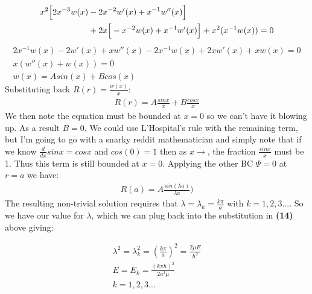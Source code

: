 \documentclass{article}
\begin{document}
\begin{equation}
\begin{aligned}
x^2 \Big{[} 2x^{-3}w(x) &- 2x^{-2}w'(x) + x^{-1}w''(x) \Big{]}\\
 &+ 2x \Big{[}-x^{-2}w(x) + x^{-1}{w'(x)} \Big{]} + x^2(x^{-1}w(x)) = 0\\
\end{aligned}
\end{equation}
\begin{equation}
\begin{aligned}
 2x^{-1}w(x) - 2w'(x) + xw''(x) - 2x^{-1}w(x) + 2xw'(x) + xw(x) = 0\\
 x(w''(x) + w(x)) = 0\\
 w(x) = Asin(x) + Bcos(x)
\end{aligned}
\end{equation}
Substituting back $R(r) = \frac{w(x)}{x}$:
\begin{equation}
\begin{aligned}
R(r) = A\frac{sinx}{x} + B\frac{cosx}{x}
\end{aligned}
\end{equation}
We then note the equation must be bounded at $x=0$ so we can't have it blowing up. As a result $B=0$. We could use L'Hospital's rule with the remaining term, but I'm going to go with a snarky reddit mathematician and simply note that if we know $\frac{d}{dx}sinx = cosx$ and $cos(0) = 1$ then as $x\to$, the fraction $\frac{sinx}{x}$ must be 1. Thus this term is still bounded at $x=0$. Applying the other BC $\Psi=0$ at $r=a$ we have:
\begin{equation}
\begin{aligned}
R(a) = A\frac{sin(\lambda a)}{\lambda a})
\end{aligned}
\end{equation}
The resulting non-trivial solution requires that $\lambda = \lambda_k=\frac{k\pi}{a}$ with $k=1,2,3...$. So we have our value for $\lambda$, which we can plug back into the substitution in \textbf{(14)} above giving:
\begin{tcolorbox}[minipage,colback=white,arc=0pt,outer arc=0pt]
\begin{equation}
\begin{aligned}
\lambda^2 = \lambda_k^2 = (\frac{k\pi}{a})^2 =  \frac{2\mu E}{h^2}\\
E = E_k = \frac{(k\pi h)^2}{2a^2\mu}\\
k = 1,2,3...
\end{aligned}
\end{equation}
\end{tcolorbox}
\end{document}

